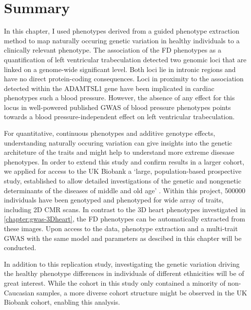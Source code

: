 \section{Summary}
In this chapter, I used phenotypes derived from a guided phenotype extraction method to map naturally occuring genetic variation in healthy individuals to a clinically relevant phenotype. The association of the FD phenotypes as a quantification of left ventricular trabeculation detected two genomic loci that are linked on a genome-wide significant level. Both loci lie in intronic regions and have no direct protein-coding consequences. Loci in proximity to the association detected within the ADAMTSL1 gene have been implicated in cardiac phenotypes such a blood pressure. However, the absence of any effect for this locus in well-powered published GWAS of blood pressure phenotypes points towards a blood pressure-independent effect on left ventricular trabeculation.

For quantitative, continuous phenotypes and additive genotype effects, understanding naturally occuring variation can give insights into the genetic architeture of the traits and might help to understand more extreme disesase phenotypes. In order to extend this study and confirm results in a larger cohort, we applied for access to the UK Biobank a `large, population-based prospective study, established to allow detailed investigations of the genetic and nongenetic determinants of the diseases of middle and old age' \citep{Sudlow2015}. Within this project, \num{500000} individuals have been genotyped and phenotyped for wide array of traits, including 2D CMR scans. In contrast to the 3D heart phenotypes investigated in \cref{chapter:gwas-3Dheart}, the FD phenotypes can be automatically extracted from these images. Upon access to the data,  phenotype extraction and a multi-trait GWAS with the same model and parameters as descibed in this chapter will be conducted. 

In addition to this replication study, investigating the genetic variation driving the healthy phenotype differences in individuals of different ethnicities \citep{Kawell2012,Captur2014} will be of great interest. While the cohort in this study only contained a minority of non-Caucasian samples, a more diverse cohort structure might be observed in the UK Biobank cohort, enabling this analysis. 
